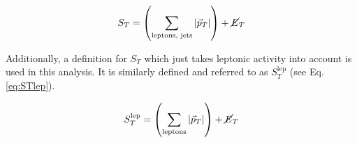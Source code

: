 	\begin{equation}
		S_T = \left( \sum_{\textrm{leptons, jets}}^{} \vert \vec{p}_T \vert \right) + \cancel{E}_T
		\label{eq:ST}
	\end{equation}
	
	\noindent Additionally, a definition for $S_T$ which just takes leptonic activity into account is used in this analysis. It is similarly defined and referred to as $S_T^{\text{lep}}$ (see Eq. \ref{eq:STlep}).
	
	\begin{equation}
		S_T^\text{lep} = \left( \sum_{\textrm{leptons}}^{} \vert \vec{p}_T \vert \right) + \cancel{E}_T
		\label{eq:STlep}
	\end{equation}	
